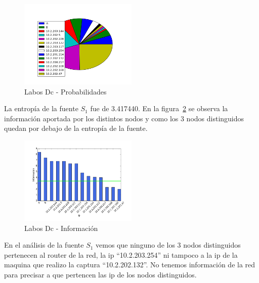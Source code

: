 \documentclass[final,inline,narroweqnarray,a4paper]{ieee}
\begin{document}
\begin{figure}[H]
    \begin{center}
        \includegraphics[width=0.5\textwidth]{plot/laboDcS1-pie.png}
        \caption{Labos Dc - Probabilidades}
        \label{torta:laboDcS1}
    \end{center}
\end{figure} 

La entropía de la fuente $S_1$ fue de 3.417440. En la figura~\ref{histo:laboDcS1} se observa la información aportada por los distintos nodos y como los 3 nodos distinguidos quedan por debajo de la entropía de la fuente. 

\begin{figure}[H]
    \begin{center}
        \includegraphics[width=0.5\textwidth]{plot/laboDcS1-bar.png}
        \caption{Labos Dc - Información}
        \label{histo:laboDcS1}
    \end{center}
\end{figure}

En el análisis de la fuente $S_1$ vemos que ninguno de los 3 nodos distinguidos pertenecen al router de la red, la ip ``10.2.203.254'' ni tampoco a la ip de la maquina que realizo la captura ``10.2.202.132''. No tenemos información de la red para precisar a que pertencen las ip de los nodos distinguidos.

\end{document}
